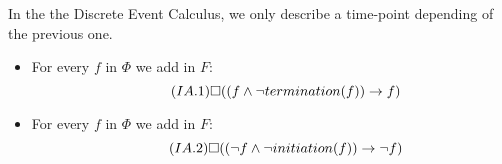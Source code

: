 In the the Discrete Event Calculus, we only describe a time-point depending of the previous one.

\begin{itemize}
  \item
    For every $f$ in $\Phi$ we add in $F$:
    \begin{equation}\tag{$IA.1$}
      \square((f \land \neg termination(f)) \rightarrow f)
    \end{equation}
  \item
    For every $f$ in $\Phi$ we add in $F$:
    \begin{equation}\tag{$IA.2$}
      \square((\neg f \land \neg initiation(f)) \rightarrow \neg f)
    \end{equation}
\end{itemize}

